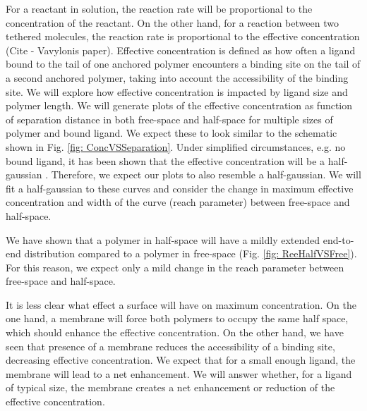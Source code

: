 \documentclass[../../AdvancementSummary.tex]{subfiles}
\begin{document}
For a reactant in solution, the reaction rate will be proportional to the concentration of the reactant. On the other hand, for a reaction between two tethered molecules, the reaction rate is proportional to the effective concentration \cite{VanValen2009, Bryant2017} (Cite - Vavylonis paper).
Effective concentration is defined as how often a ligand bound to the tail of one anchored polymer encounters a binding site on the tail of a second anchored polymer, taking into account the accessibility of the binding site. 
We will explore how effective concentration is impacted by ligand size and polymer length. We will generate plots of the effective concentration as function of separation distance in both free-space and half-space for multiple sizes of polymer and bound ligand. We expect these to look similar to the schematic shown in Fig. \ref{fig: ConcVSSeparation}. Under simplified circumstances, e.g. no bound ligand, it has been shown that the effective concentration will be a half-gaussian \cite{Goyette2017}. Therefore, we expect our plots to also resemble a half-gaussian. We will fit a half-gaussian to these curves and consider the change in maximum effective concentration and width of the curve (reach parameter) between free-space and half-space. 

We have shown that a polymer in half-space will have a mildly extended end-to-end distribution compared to a polymer in free-space (Fig. \ref{fig: ReeHalfVSFree}). For this reason, we expect only a mild change in the reach parameter between free-space and half-space. 

It is less clear what effect a surface will have on maximum concentration. 
	On the one hand, a membrane will force both polymers to occupy the same half space, which should enhance the effective concentration.
	On the other hand, we have seen that presence of a membrane reduces the accessibility of a binding site, decreasing effective concentration. 
	We expect that for a small enough ligand, the membrane will lead to a net enhancement. We will answer whether, for a ligand of typical size, the membrane creates a net enhancement or reduction of the effective concentration.


\end{document}
